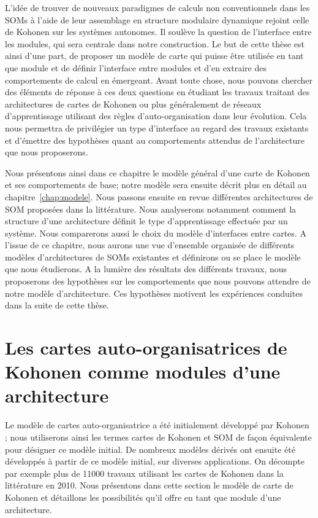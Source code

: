 \documentclass[../main]{subfiles}
\begin{document}
L'idée de trouver de nouveaux paradigmes de calculs non conventionnels dans les SOMs à l'aide de leur assemblage en structure modulaire dynamique rejoint celle de Kohonen sur les systèmes autonomes. Il soulève la question de l'interface entre les modules, qui sera centrale dans notre construction. 
Le but de cette thèse est ainsi d'une part, de proposer un modèle de carte qui puisse être utilisée en tant que module et de définir l'interface entre modules et d'en extraire des comportements de calcul en émergeant. 
Avant toute chose, nous pouvons chercher des éléments de réponse à ces deux questions en étudiant les travaux traitant des architectures de cartes de Kohonen ou plus généralement de réseaux d'apprentissage utilisant des règles d'auto-organisation dans leur évolution. Cela nous permettra de privilégier un type d'interface au regard des travaux existants et d'émettre des hypothèses quant au comportements attendus de l'architecture que nous proposerons.

Nous présentons ainsi dans ce chapitre le modèle général d'une carte de Kohonen et ses comportements de base; notre modèle sera ensuite décrit plus en détail au chapitre~\ref{chap:modele}.
Nous passons ensuite en revue différentes architectures de SOM proposées dans la littérature. 
Nous analyserons notamment comment la structure d'une architecture définit le type d'apprentissage effectuée par un système. Nous comparerons aussi le choix du modèle d'interfaces entre cartes.
A l'issue de ce chapitre, nous aurons une vue d'ensemble organisée de différents modèles d'architectures de SOMs existantes et définirons ou se place le modèle que nous étudierons.
A la lumière des résultats des différents travaux, nous proposerons des hypothèses sur les comportements que nous pouvons attendre de notre modèle d'architecture. 
Ces hypothèses motivent les expériences conduites dans la suite de cette thèse. 

\section{Les cartes auto-organisatrices de Kohonen comme modules d'une architecture}\label{sec:som001}

Le modèle de cartes auto-organisatrice a été initialement développé par Kohonen \cite{Kohonen1982}; nous utiliserons ainsi les termes cartes de Kohonen et SOM de façon équivalente pour désigner ce modèle initial.
De nombreux modèles dérivés ont ensuite été développés à partir de ce modèle initial, sur diverses applications.
On décompte par exemple plus de 11000 travaux utilisant les cartes de Kohonen dans la littérature en 2010.
Nous présentons dans cette section le modèle de carte de Kohonen et détaillons les possibilités qu'il offre en tant que module d'une architecture. 
\end{document}
